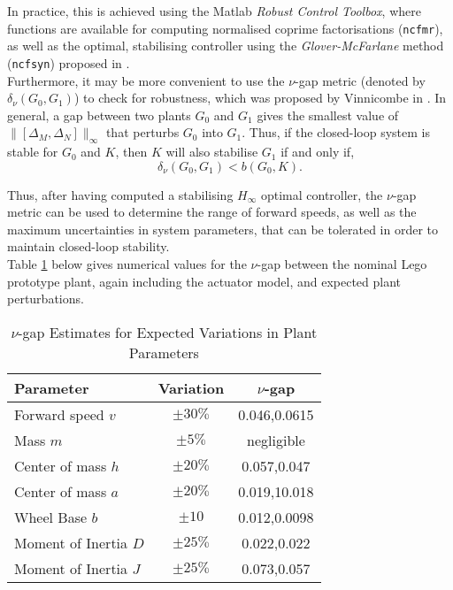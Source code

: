 In practice, this is achieved using the Matlab \textit{Robust Control Toolbox}, where functions are available for computing normalised coprime factorisations (\texttt{ncfmr}), as well as the optimal, stabilising controller using the \textit{Glover-McFarlane} method (\texttt{ncfsyn}) proposed in \cite{hinf}. \\

Furthermore, it may be more convenient to use the $\nu$-gap metric (denoted by $\delta_{\nu}(G_0,G_1)$) to check for robustness, which was proposed by Vinnicombe in \cite{nugap}. In general, a gap between two plants $G_0$ and $G_1$ gives the smallest value of $\lVert [\Delta_M, \Delta_N] \rVert_{\infty}$ that perturbs $G_0$ into $G_1$. Thus, if the closed-loop system is stable for $G_0$ and $K$, then $K$ will also stabilise $G_1$ if and only if,
\begin{equation*}
\delta_{\nu}(G_0,G_1) < b(G_0,K).
\end{equation*}

Thus, after having computed a stabilising $H_{\infty}$ optimal controller, the $\nu$-gap metric can be used to determine the range of forward speeds, as well as the maximum uncertainties in system parameters, that can be tolerated in order to maintain closed-loop stability. \\

Table \ref{table:nugap} below gives numerical values for the $\nu$-gap between the nominal Lego prototype plant, again including the actuator model, and expected plant perturbations.

\begin{table}[H]
	\centering
 	\begin{tabular}[t]{lcc} 
 	\toprule
 	Parameter & Variation & $\nu$-gap\\ 
 	\midrule
 	Forward speed $v$ & $\pm 30\%$ & 0.046,0.0615  \\
 	Mass $m$ & $\pm 5\%$ & negligible \\ 
 	Center of mass $h$ & $\pm 20\%$ & 0.057,0.047 \\
 	Center of mass $a$ & $\pm 20\%$ & 0.019,10.018\\
 	Wheel Base $b$ & $\pm 10$ & 0.012,0.0098\\
 	Moment of Inertia $D$ & $\pm 25\%$ & 0.022,0.022\\
 	Moment of Inertia $J$ & $\pm 25\%$ & 0.073,0.057\\
 	\bottomrule
	\end{tabular}
 	\caption{$\nu$-gap Estimates for Expected Variations in Plant Parameters}
 	\label{table:nugap}
\end{table}

